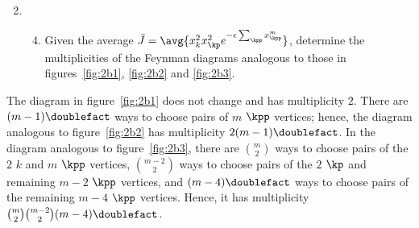 \begin{enumerate}[leftmargin=0cm]
  \setcounter{enumi}{1}
  \item
        \begin{enumerate}
          \setcounter{enumii}{3}
          \item \label{2d}
                Given the average $\tilde{J} = \avg{x_k^2 x_\kp^2 e^{- \epsilon \sum_\kpp
                        x_\kpp^m }}$, determine the multiplicities of the Feynman diagrams analogous to
                those in figures~\ref{fig:2b1}, \ref{fig:2b2} and \ref{fig:2b3}.
        \end{enumerate}
\end{enumerate}

The diagram in figure~\ref{fig:2b1} does not change and has multiplicity $2$.
There are $(m - 1)\doublefact$ ways to choose pairs of $m$ $\kpp$ vertices;
hence, the diagram analogous to figure~\ref{fig:2b2} has multiplicity $2 (m -
  1)\doublefact$.
In the diagram analogous to figure~\ref{fig:2b3}, there are ${m \choose 2}$
ways to choose pairs of the $2$ $k$ and $m$ $\kpp$ vertices, ${m - 2 \choose
      2}$ ways to choose pairs of the $2$ $\kp$ and remaining $m - 2$ $\kpp$
vertices, and $(m - 4)\doublefact$ ways to choose pairs of the remaining $m -
  4$ $\kpp$ vertices.
Hence, it has multiplicity ${m \choose 2} {m - 2 \choose 2} (m -
  4)\doublefact$.
